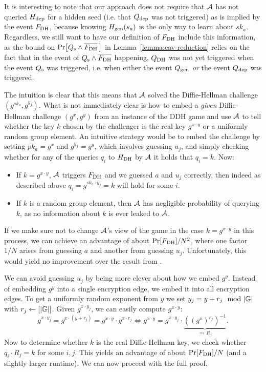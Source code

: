 
It is interesting to note that our approach does not require that $\mathcal{A}$ has not queried $H_\mathrm{dep}$ for a hidden seed (i.e. that $Q_\mathrm{dep}$ was not triggered) as is implied by the event $F_\mathrm{DH}$, because knowing $H_\mathrm{gen}(s_a)$ is the only way to learn about $sk_a$. Regardless, we still want to have our definition of $F_\mathrm{DH}$ include this information, as the bound on $\pr{\qs \land \overline{\fdh} \,}$ in Lemma~\vref{lemma:eav-reduction} relies on the fact that in the event of $Q_\mathrm{s} \land \overline{F_\mathrm{DH}}$ happening,  $Q_\mathrm{DH}$ was not yet triggered when the event $Q_\mathrm{s}$ was triggered, i.e. when either the event $Q_\mathrm{gen}$ \emph{or} the event $Q_\mathrm{dep}$ was triggered.

The intuition is clear that this means that $\mathcal{A}$ solved the Diffie-Hellman challenge $(g^{sk_a}, g^{y_j})$. What is not immediately clear is how to embed a \emph{given} Diffie-Hellman challenge $(g^x, g^y)$  from an instance of the DDH game and use $\mathcal{A}$ to tell whether the key $k$ chosen by the challenger is the real key $g^{x \cdot y}$ or a uniformly random group element.
An intuitive strategy would be to embed the challenge by setting $pk_a = g^x$ and $g^{y_j} = g^y$, which involves guessing $u_j$, and simply checking whether for any of the queries $q_i$ to $H_\mathrm{DH}$ by $\mathcal{A}$ it holds that $q_i = k$. Now:
\begin{itemize}
	\item If $k = g^{x \cdot y}$, $\mathcal{A}$ triggers $F_\mathrm{DH}$ and we guessed $a$ and $u_j$ correctly, then indeed as described above $q_i = g^{sk_a \cdot y_j} = k$ will hold for some $i$.
	\item If $k$ is a random group element, then $\mathcal{A}$ has negligible probability of querying $k$, as no information about $k$ is ever leaked to $\mathcal{A}$.
\end{itemize}
If we make sure not to change $\mathcal{A}$'s view of the game in the case $k = g^{x \cdot y}$ in this process, we can achieve an advantage of about $\pr{\fdh} / N^2$, where one factor $1/N$ arises from guessing $a$ and another from guessing $u_j$. Unfortunately, this would yield no improvement over the result from \cite{ttkem}.

 We can avoid guessing $u_j$ by being more clever about how we embed $g^y$. Instead of embedding $g^y$ into a single encryption edge, we embed it into all encryption edges. To get a uniformly random exponent from $y$ we set $y_j = y + r_j \mod \abs{\mathbb{G}}$ with $r_j \leftarrow [\lvert\mathbb{G}\rvert]$. Given $g^{x \cdot y_j}$, we can easily compute $g^{x \cdot y}$:
\[
	g^{x \cdot y_j} = g^{x \cdot (y + r_j)} = g^{x \cdot y}	\cdot g^{x \cdot r_j} \iff g^{x \cdot y} = g^{x \cdot y_j} \cdot \underbrace{((g^x)^{r_j})^{-1}}_{\eqqcolon \, R_j}.
\]
Now to determine whether $k$ is the real Diffie-Hellman key, we check whether $q_i \cdot R_j = k$ for some $i, j$. This yields an advantage of about $\pr{\fdh} / N$ (and a slightly larger runtime). We can now proceed with the full proof.

